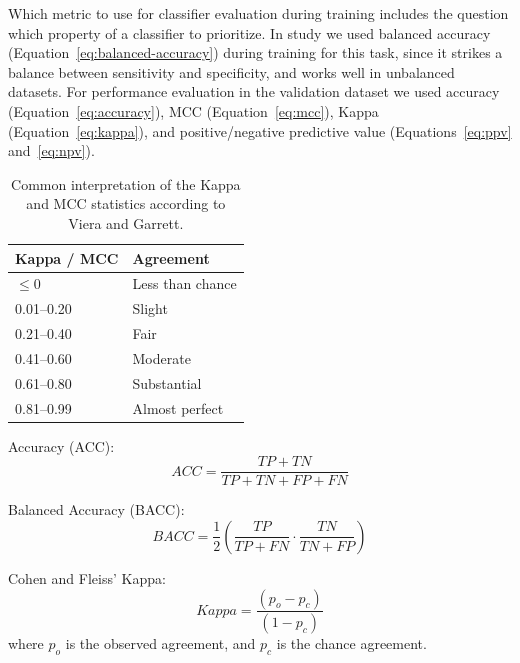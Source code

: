 \documentclass[11pt]{book}
\begin{document}
Which metric to use for classifier evaluation during training includes the question which property of a classifier to prioritize. In study \III we used balanced accuracy (Equation~\ref{eq:balanced-accuracy}) \cite{Brodersen:2010} during training for this task, since it strikes a balance between sensitivity and specificity, and works well in unbalanced datasets. For performance evaluation in the validation dataset we used accuracy (Equation~\ref{eq:accuracy}), MCC (Equation~\ref{eq:mcc}), Kappa (Equation~\ref{eq:kappa}), and positive/negative predictive value (Equations~\ref{eq:ppv} and~\ref{eq:npv}).

\begin{table}[t]
\centering
\caption[Interpretation of the Kappa and MCC Statistics]{Common interpretation of the Kappa and MCC statistics according to Viera and Garrett.}
\label{tab:kappa-interpretation}
\begin{tabular}{ ll }
\toprule
Kappa / MCC & Agreement \\
\midrule
$\leq0$     & Less than chance \\
 0.01--0.20 & Slight \\
 0.21--0.40 & Fair \\
 0.41--0.60 & Moderate \\
 0.61--0.80 & Substantial \\
 0.81--0.99 & Almost perfect \\
\bottomrule
\end{tabular}
\end{table}


Accuracy (ACC):
\begin{equation} \label{eq:accuracy}
ACC = \frac{TP + TN}{TP + TN + FP + FN}
\end{equation}

Balanced Accuracy (BACC):
\begin{equation} \label{eq:balanced-accuracy}
BACC = \frac{1}{2}(\frac{TP}{TP + FN} \cdot \frac{TN}{TN + FP})
\end{equation}

Cohen and Fleiss' Kappa:
\begin{equation} \label{eq:kappa}
Kappa = \frac{(p_{o} - p_{c})}{(1 - p_{c})}
\end{equation}
where $p_{o}$ is the observed agreement, and $p_{c}$ is the chance agreement.
\end{document}

